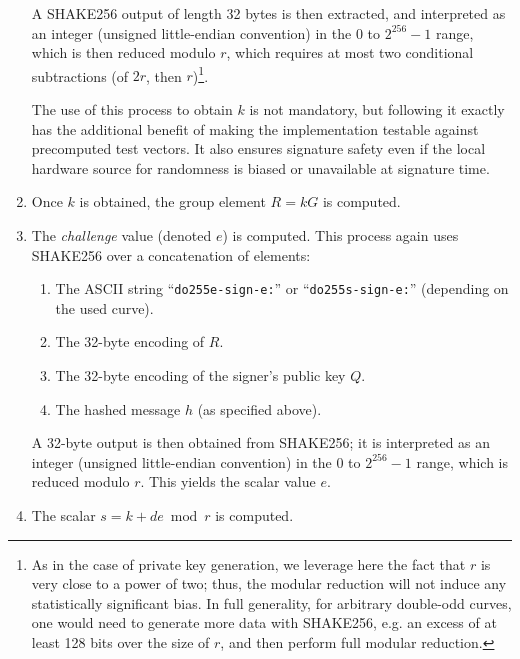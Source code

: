 \documentclass{llncs}
\begin{document}
\begin{enumerate}
\begin{enumerate}
    \end{enumerate}
    A SHAKE256 output of length 32 bytes is then extracted, and
    interpreted as an integer (unsigned little-endian convention) in the
    $0$ to $2^{256}-1$ range, which is then reduced modulo $r$, which
    requires at most two conditional subtractions (of $2r$, then
    $r$)\footnote{As in the case of private key generation, we leverage
    here the fact that $r$ is very close to a power of two; thus, the
    modular reduction will not induce any statistically significant
    bias. In full generality, for arbitrary double-odd curves, one would
    need to generate more data with SHAKE256, e.g. an excess of at least
    128 bits over the size of $r$, and then perform full modular
    reduction.}.

    The use of this process to obtain $k$ is not mandatory, but following
    it exactly has the additional benefit of making the implementation
    testable against precomputed test vectors. It also ensures signature
    safety even if the local hardware source for randomness is biased or
    unavailable at signature time.

    \item Once $k$ is obtained, the group element $R = kG$ is computed.

    \item The \emph{challenge} value (denoted $e$) is computed. This
    process again uses SHAKE256 over a concatenation of elements:
    \begin{enumerate}

        \item The ASCII string ``\verb+do255e-sign-e:+'' or
        ``\verb+do255s-sign-e:+'' (depending on the used curve).

        \item The 32-byte encoding of $R$.

        \item The 32-byte encoding of the signer's public key $Q$.

        \item The hashed message $h$ (as specified above).

    \end{enumerate}
    A 32-byte output is then obtained from SHAKE256; it is interpreted
    as an integer (unsigned little-endian convention) in the $0$ to
    $2^{256}-1$ range, which is reduced modulo $r$. This yields the
    scalar value $e$.

    \item The scalar $s = k + de \bmod r$ is computed.

\end{enumerate}
\end{document}
